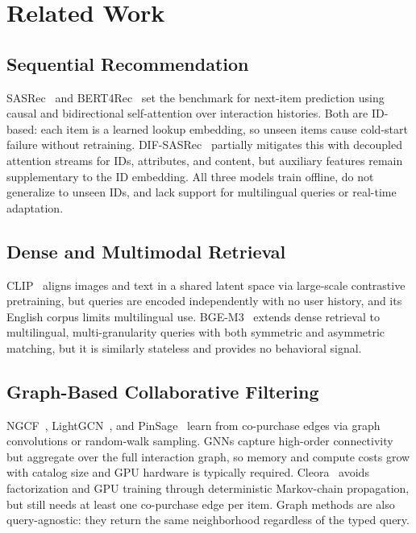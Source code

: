 \section{Related Work}
\label{sec:related}

\subsection{Sequential Recommendation}
SASRec~\cite{kang2018self} and BERT4Rec~\cite{sun2019bert4rec} set the
benchmark for next-item prediction using causal and bidirectional
self-attention over interaction histories.
Both are ID-based: each item is a learned lookup embedding, so unseen
items cause cold-start failure without retraining.
DIF-SASRec~\cite{xie2022difsr} partially mitigates this with decoupled
attention streams for IDs, attributes, and content, but auxiliary features
remain supplementary to the ID embedding.
All three models train offline, do not generalize to unseen IDs, and lack
support for multilingual queries or real-time adaptation.

\subsection{Dense and Multimodal Retrieval}
CLIP~\cite{radford2021clip} aligns images and text in a shared latent
space via large-scale contrastive pretraining, but queries are encoded
independently with no user history, and its English corpus limits
multilingual use.
BGE-M3~\cite{chen2024bgem3} extends dense retrieval to multilingual,
multi-granularity queries with both symmetric and asymmetric matching,
but it is similarly stateless and provides no behavioral signal.

\subsection{Graph-Based Collaborative Filtering}
NGCF~\cite{wang2019ngcf}, LightGCN~\cite{he2020lightgcn}, and
PinSage~\cite{ying2018pinsage} learn from co-purchase edges via graph
convolutions or random-walk sampling.
GNNs capture high-order connectivity but aggregate over the full
interaction graph, so memory and compute costs grow with catalog size
and GPU hardware is typically required.
Cleora~\cite{cleora2021} avoids factorization and GPU training through
deterministic Markov-chain propagation, but still needs at least one
co-purchase edge per item. Graph methods are also query-agnostic: they return
the same neighborhood regardless of the typed query.

